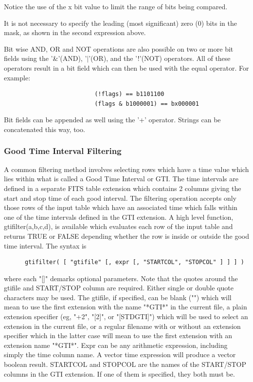 \documentclass[11pt]{article}
\begin{document}
Notice the use of the x bit value to limit the range of  bits  being
compared.

It  is  not necessary to specify the leading (most significant) zero
(0) bits in the mask, as shown in the second expression above.

Bit wise AND, OR and NOT operations are  also  possible  on  two  or
more  bit  fields  using  the  '\&'(AND),  '$|$'(OR),  and the '!'(NOT)
operators. All of these operators result in a bit  field  which  can
then be used with the equal operator. For example:


\begin{verbatim}
                          (!flags) == b1101100
                          (flags & b1000001) == bx000001
\end{verbatim}

Bit  fields can be appended as well using the '+' operator.  Strings
can be concatenated this way, too.

\subsubsection{Good Time Interval Filtering}

    A common filtering method involves selecting rows which have a time
    value which lies within what is called a Good Time Interval or GTI.
    The time intervals are defined in a separate FITS table extension
    which contains 2 columns giving the start and stop time of each
    good interval.  The filtering operation accepts only those rows of
    the input table which have an associated time which falls within
    one of the time intervals defined in the GTI extension. A high
    level function, gtifilter(a,b,c,d), is available which evaluates
    each row of the input table  and returns TRUE  or FALSE depending
    whether the row is inside or outside the  good time interval.  The
    syntax is

\begin{verbatim}
      gtifilter( [ "gtifile" [, expr [, "STARTCOL", "STOPCOL" ] ] ] )
\end{verbatim}
    where  each "[]" demarks optional parameters.  Note that  the quotes
    around the gtifile and START/STOP column are required.  Either single
    or double quote characters may be used.  The gtifile,
    if specified,  can be blank  ("") which will  mean to use  the first
    extension  with   the name "*GTI*"  in   the current  file,  a plain
    extension  specifier (eg, "+2",  "[2]", or "[STDGTI]") which will be
    used  to  select  an extension  in  the current  file, or  a regular
    filename with or without an extension  specifier which in the latter
    case  will mean to  use the first  extension  with an extension name
    "*GTI*".  Expr can be   any arithmetic expression, including  simply
    the time  column  name.  A  vector  time expression  will  produce a
    vector boolean  result.  STARTCOL and  STOPCOL are the  names of the
    START/STOP   columns in the    GTI extension.  If   one  of them  is
    specified, they both  must be.
\end{document}
